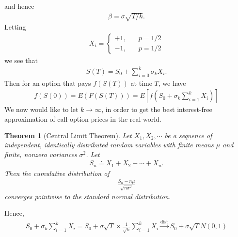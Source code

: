 \documentclass[12pt]{article}
\theoremstyle{plain}
\newtheorem{theorem}{Theorem}
\theoremstyle{definition}
\theoremstyle{remark}
\numberwithin{equation}{section}  %
\begin{document}
	and hence
	\begin{equation*}
		\begin{split}
			\beta = \sigma \sqrt{T/k}.
		\end{split}
	\end{equation*}
	Letting
	\begin{equation*}
		\begin{split}
			X_{i} = 
			\begin{cases}
				+1, & \quad p=1/2 \\
				-1, & \quad p=1/2
			\end{cases}
		\end{split}
	\end{equation*}
	we see that
	\begin{equation*}
		\begin{split}
			S(T) = S_{0} + \sum_{i = 0}^{k} \sigma_{k} X_{i}.
		\end{split}
	\end{equation*}
	Then for an option that pays $f(S(T))$ at time $T$, we have
	\begin{equation*}
		\begin{split}
			f(S(0)) = E(F(S(T)))
			= E[f(S_{0} + \sigma_{k} \sum_{i=1}^{k} X_{i})]
		\end{split}
	\end{equation*}
	We now would like to let $k \to \infty$, in order to get the best interest-free
	approximation of call-option prices in the real-world.
	\begin{theorem}[Central Limit Theorem]\label{thm:central-lim-thm}
		Let $X_{1}, X_{2}, \cdots$ be a sequence of independent, identically
		distributed random variables with finite means $\mu$ and finite, nonzero
		variances $\sigma^{2}$. Let
		\begin{equation*}
			\begin{split}
				S_{n} \doteq X_{1} + X_{2} + \cdots + X_{n}.
			\end{split}
		\end{equation*}
		Then the cumulative distribution of 
		\begin{equation*}
			\begin{split}
				\frac{S_{n} - n \mu}{\sqrt{n \sigma^{2}}}
			\end{split}
		\end{equation*}
		converges pointwise to the standard normal distribution.
	\end{theorem}
	Hence,
	\begin{equation*}
		\begin{split}
			S_{0} + \sigma_{k} \sum_{i = 1}^{k} X_{i}
			= S_{0} + \sigma \sqrt{T} \times \frac{1}{\sqrt{k}} \sum_{i = 1}^{k}
			X_{i}
			\xrightarrow{\text{dist}} S_{0} + \sigma \sqrt{T} N(0,1)
		\end{split}
	\end{equation*}
\end{document}
